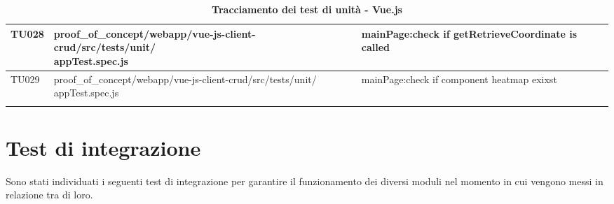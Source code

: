 \begin{center}
\begin{longtable}{|p{1.5cm}|p{11.5cm}|p{3.5cm}|}
		\hline
		\centering TU028 & \makecell[c]{proof{\_}of{\_}concept/webapp/vue-js-client-crud/src/tests/unit/\\appTest.spec.js} & {mainPage:check if getRetrieveCoordinate is called}\\
		\hline
		\centering TU029 & \makecell[c]{proof{\_}of{\_}concept/webapp/vue-js-client-crud/src/tests/unit/\\appTest.spec.js} & mainPage:check if component heatmap exixst\\
		\hline
		\rowcolor{white}
		\caption{\textbf{Tracciamento dei test di unità - Vue.js}}
	\end{longtable}
\end{center}

\section{Test di integrazione}\label{SpecificaDeiTestTestDiIntegrazione}
Sono stati individuati i seguenti test di integrazione per garantire il funzionamento dei diversi moduli nel momento in cui vengono messi in relazione tra di loro.
\def\tabularxcolumn#1{m{#1}}
